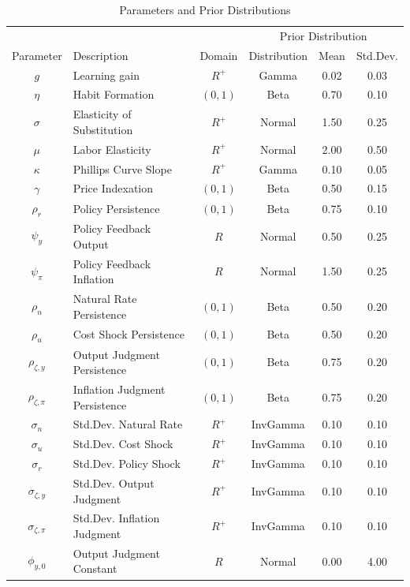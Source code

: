 \documentclass[10pt]{article}
\begin{document}
{\begin{table}
\centering
\caption{Parameters and Prior Distributions}\label{tb:parms}
\begin{center}
\begin{tabular}{c|l|c||c|cc} \hline
\multicolumn{3}{c}{} & \multicolumn{3}{c}{Prior Distribution} \\ 
Parameter & Description & Domain & Distribution & Mean & Std.Dev. \\ \hline 
$g$ & Learning gain & $R^{+}$ & Gamma & 0.02 & 0.03 \\ 
$\eta$ & Habit Formation & $(0,1)$ & Beta & 0.70 & 0.10 \\ 
$\sigma$ & Elasticity of Substitution & $R^{+}$ & Normal & 1.50 & 0.25 \\ 
$\mu$ & Labor Elasticity & $R^{+}$ & Normal & 2.00 & 0.50 \\ 
$\kappa$ & Phillips Curve Slope & $R^{+}$ & Gamma & 0.10 & 0.05 \\ 
$\gamma$ & Price Indexation & $(0,1)$ & Beta & 0.50 & 0.15 \\ 
$\rho_r$ & Policy Persistence & $(0,1)$ & Beta & 0.75 & 0.10 \\ 
$\psi_y$ & Policy Feedback Output & $R$ & Normal & 0.50 & 0.25 \\ 
$\psi_{\pi}$ & Policy Feedback Inflation & $R$ & Normal & 1.50 & 0.25 \\ 
$\rho_n$ & Natural Rate Persistence & $(0,1)$ & Beta & 0.50 & 0.20 \\ 
$\rho_u$ & Cost Shock Persistence & $(0,1)$ & Beta & 0.50 & 0.20 \\ 
$\rho_{\zeta,y}$ & Output Judgment Persistence & $(0,1)$ & Beta & 0.75 & 0.20 \\ 
$\rho_{\zeta,\pi}$ & Inflation Judgment Persistence & $(0,1)$ & Beta & 0.75 & 0.20 \\ 
$\sigma_{n}$ & Std.Dev. Natural Rate & $R^{+}$ & InvGamma & 0.10 & 0.10 \\ 
$\sigma_{u}$ & Std.Dev. Cost Shock & $R^{+}$ & InvGamma & 0.10 & 0.10 \\ 
$\sigma_{r}$ & Std.Dev. Policy Shock & $R^{+}$ & InvGamma & 0.10 & 0.10 \\ 
$\sigma_{\zeta,y}$ & Std.Dev. Output Judgment & $R^{+}$ & InvGamma & 0.10 & 0.10 \\ 
$\sigma_{\zeta,\pi}$ & Std.Dev. Inflation Judgment & $R^{+}$ & InvGamma & 0.10 & 0.10 \\ 
$\phi_{y,0}$ & Output Judgment Constant & $R$ & Normal & 0.00 & 4.00 \\ 

\end{tabular}
\end{center}
\end{table}}
\end{document}

